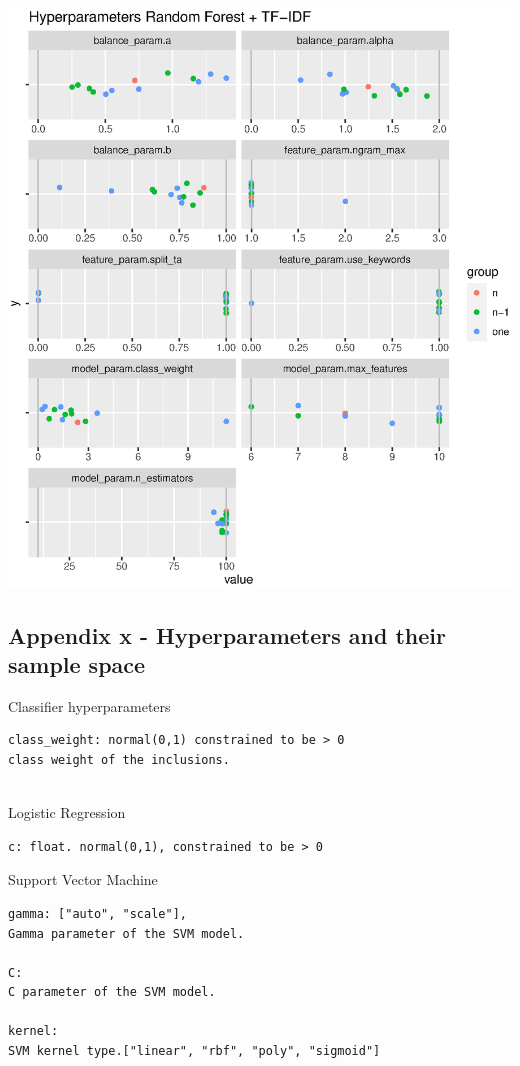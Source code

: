 \documentclass[
]{article}
\begin{document}
\includegraphics{figs/rf_tfidf.eps}

\hypertarget{appendix-x---hyperparameters-and-their-sample-space}{%
\subsection{Appendix x - Hyperparameters and their sample
space}\label{appendix-x---hyperparameters-and-their-sample-space}}

Classifier hyperparameters

\begin{verbatim}
class_weight: normal(0,1) constrained to be > 0
class weight of the inclusions.
                 
\end{verbatim}

Logistic Regression

\begin{verbatim}
c: float. normal(0,1), constrained to be > 0
\end{verbatim}

Support Vector Machine

\begin{verbatim}
gamma: ["auto", "scale"],
Gamma parameter of the SVM model.

C: 
C parameter of the SVM model.

kernel:
SVM kernel type.["linear", "rbf", "poly", "sigmoid"]
\end{verbatim}
\end{document}
